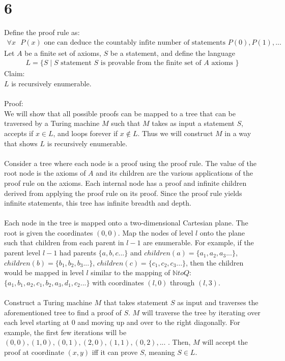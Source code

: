 \documentclass[letterpaper,notitlepage,twoside]{article}
\newcommand{\N}{\mathbb{N}} %
\begin{document}
\section*{6}
Define the proof rule as:
\begin{align*}
\forall x \text{ } P(x) \text{ one can deduce the countably infite number of statements } P(0),P(1),...
\end{align*}
Let $A$ be a finite set of axioms, $S$ be a statement, and define the language
\begin{align*}
L = \lbrace S \mid S \text{ statement } S \text{ is provable from the finite set of } A \text { axioms }\rbrace
\end{align*}
Claim:
\\
$L$ is recursively enumerable.
\\
\\
Proof:
\\
We will show that all possible proofs can be mapped to a tree that can be traversed by a Turing machine $M$ such that $M$ takes as input a statement $S$, accepts if $x \in L$, and loops forever if $x \notin L$. Thus we will construct $M$ in a way that shows $L$ is recursively enumerable.
\\
\\
Consider a tree where each node is a proof using the proof rule. The value of the root node is the axioms of $A$ and its children are the various applications of the proof rule on the axioms. Each internal node has a proof and infinite children derived from applying the proof rule on its proof. Since the proof rule yields infinite statements, this tree has infinite breadth and depth.
\\
\\
Each node in the tree is mapped onto a two-dimensional Cartesian plane. The root is given the coordinates $\left( 0,0 \right)$. Map the nodes of level $l$ onto the plane such that children from each parent in $l-1$ are enumerable. For example, if the parent level $l-1$ had parents $\lbrace a, b, c... \rbrace$ and $children(a)=\lbrace a_1, a_2, a_3... \rbrace$, $children(b)=\lbrace b_1, b_2, b_3... \rbrace$, $children(c) = \lbrace c_1, c_2, c_3... \rbrace$, then the children would be mapped in level $l$ similar to the mapping of $\N to Q$: $\lbrace a_1, b_1, a_2, c_1, b_2, a_3, d_1, c_2... \rbrace$ with coordinates $\left( l, 0 \right)$ through $\left( l,3 \right)$.
\\
\\
Construct a Turing machine $M$ that takes statement $S$ as input and traverses the aforementioned tree to find a proof of $S$. $M$ will traverse the tree by iterating over each level starting at 0 and moving up and over to the right diagonally. For example, the first few iterations will be $\left( 0,0 \right),\left( 1,0 \right),\left( 0,1 \right),\left( 2,0 \right),\left( 1,1 \right),\left( 0,2 \right),...$ . Then, $M$ will accept the proof at coordinate $\left( x,y \right)$ iff it can prove $S$, meaning $S \in L$.
\end{document}
